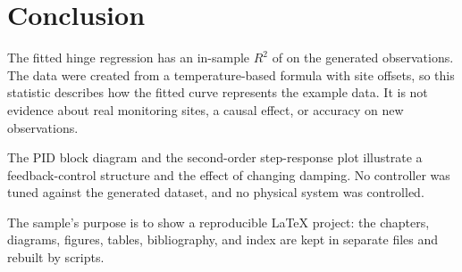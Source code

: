 \chapter{Conclusion}\label{ch:concl}

The fitted hinge regression has an in-sample $R^2$ of \hingeRtwo{} on the generated observations. The data were created from a temperature-based formula with site offsets, so this statistic describes how the fitted curve represents the example data. It is not evidence about real monitoring sites, a causal effect, or accuracy on new observations.

The PID block diagram and the second-order step-response plot illustrate a feedback-control structure and the effect of changing damping. No controller was tuned against the generated dataset, and no physical system was controlled.

The sample's purpose is to show a reproducible LaTeX project: the chapters, diagrams, figures, tables, bibliography, and index are kept in separate files and rebuilt by scripts.
